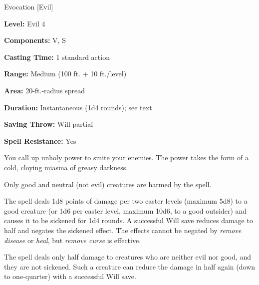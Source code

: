 
Evocation [Evil]

\textbf{Level:} Evil 4

\textbf{Components:} V, S

\textbf{Casting Time:} 1 standard action

\textbf{Range:} Medium (100 ft. + 10 ft./level)

\textbf{Area:} 20-ft.-radius spread

\textbf{Duration:} Instantaneous (1d4 rounds); see text

\textbf{Saving Throw:} Will partial

\textbf{Spell Resistance:} Yes

You call up unholy power to smite your enemies. The power takes the form of a cold, 
cloying miasma of greasy darkness.

Only good and neutral (not evil) creatures are harmed by the spell.

The spell deals 1d8 points of damage per two caster levels (maximum 5d8) to a good 
creature (or 1d6 per caster level, maximum 10d6, to a good outsider) and causes 
it to be sickened for 1d4 rounds. A successful Will save reduces damage to half 
and negates the sickened effect. The effects cannot be negated by \textit{remove 
disease} or \textit{heal}, but \textit{remove curse} is effective.

The spell deals only half damage to creatures who are neither evil nor good, and 
they are not sickened. Such a creature can reduce the damage in half again (down 
to one-quarter) with a successful Will save.

